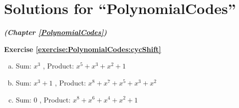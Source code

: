 \section{Solutions for ``PolynomialCodes''}
\label{sec:AnswerKey:PolynomialCodes}
\noindent\textbf{\textit{ (Chapter \ref{PolynomialCodes})}}\bigskip

\noindent\textbf{Exercise \ref{exercise:PolynomialCodes:cycShift}}
\begin{enumerate} [(a)]
\item
 Sum: $x^3$ , Product: $x^5+x^3+x^2+1$
\item
 Sum: $x^3+1$ , Product: $x^8+x^7+x^5+x^3+x^2$
\item
 Sum: $0$ , Product: $x^8+x^6+x^4+x^2+1$
\end {enumerate}





